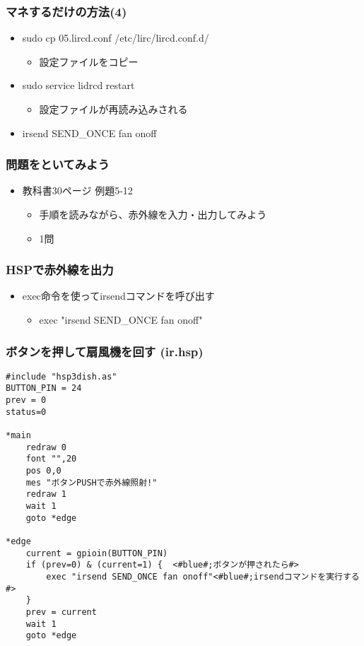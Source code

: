 \begin{frame}
    \frametitle{マネするだけの方法(4)}
    \begin{itemize}
        \item sudo cp 05.lircd.conf /etc/lirc/lircd.conf.d/
        \begin{itemize}
            \item 設定ファイルをコピー
        \end{itemize}
        \item sudo service lidrcd restart
        \begin{itemize}
            \item 設定ファイルが再読み込みされる
        \end{itemize}
        \item irsend SEND\_ONCE \color{red}fan onoff\color{black}
    \end{itemize}
\end{frame}

\begin{frame}
    \frametitle{問題をといてみよう}
    \begin{itemize}
        \item 教科書30ページ 例題5-12
        \begin{itemize}
            \item 手順を読みながら、赤外線を入力・出力してみよう
            \item 1問
        \end{itemize}
    \end{itemize}
\end{frame}

\begin{frame}
    \frametitle{HSPで赤外線を出力}
    \begin{itemize}
        \item exec命令を使ってirsendコマンドを呼び出す
        \begin{itemize}
            \item exec "irsend SEND\_ONCE fan onoff" 
        \end{itemize}
    \end{itemize}
\end{frame}

\begin{frame}[fragile]
    \frametitle{ボタンを押して扇風機を回す (ir.hsp)}
\begin{lstlisting}
#include "hsp3dish.as"
BUTTON_PIN = 24
prev = 0
status=0

*main
    redraw 0 
    font "",20
    pos 0,0
    mes "ボタンPUSHで赤外線照射!"
    redraw 1
    wait 1
    goto *edge

*edge
    current = gpioin(BUTTON_PIN)
    if (prev=0) & (current=1) {	 <#blue#;ボタンが押されたら#>
        exec "irsend SEND_ONCE fan onoff"<#blue#;irsendコマンドを実行する#>
    }
    prev = current
    wait 1
    goto *edge
\end{lstlisting}
\end{frame}

